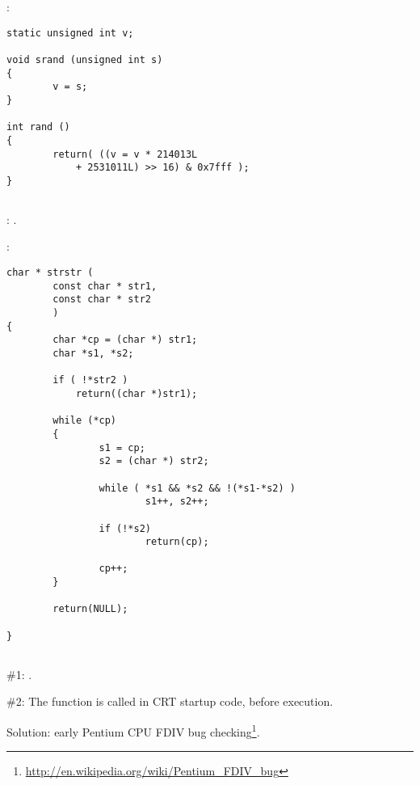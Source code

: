 :

\begin{lstlisting}
static unsigned int v;

void srand (unsigned int s)
{
        v = s;
}

int rand ()
{
        return( ((v = v * 214013L
            + 2531011L) >> 16) & 0x7fff );
}
\end{lstlisting}

\subsection{}

: .

:

\begin{lstlisting}
char * strstr (
        const char * str1,
        const char * str2
        )
{
        char *cp = (char *) str1;
        char *s1, *s2;

        if ( !*str2 )
            return((char *)str1);

        while (*cp)
        {
                s1 = cp;
                s2 = (char *) str2;

                while ( *s1 && *s2 && !(*s1-*s2) )
                        s1++, s2++;

                if (!*s2)
                        return(cp);

                cp++;
        }

        return(NULL);

}
\end{lstlisting}

\subsection{}

 \#1:  
\EMDASH{}.

 \#2: 
{The function is called in \ac{CRT} startup code, before \main execution}.

{Solution: early Pentium CPU FDIV bug checking}\footnote{\url{http://en.wikipedia.org/wiki/Pentium_FDIV_bug}}.

